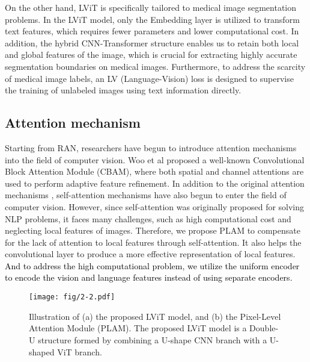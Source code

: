 \documentclass[lettersize,journal]{IEEEtran}
\begin{document}
{On the other hand, LViT is specifically tailored to medical image segmentation problems. In the LViT model, only the Embedding layer is utilized to transform text features, which requires fewer parameters and lower computational cost. 
In addition, the hybrid CNN-Transformer structure enables us to retain both local and global features of the image, which is crucial for extracting highly accurate segmentation boundaries on medical images. Furthermore, to address the scarcity of medical image labels, an LV (Language-Vision) loss is designed to supervise the training of unlabeled images using text information directly.
}
\subsection{Attention mechanism}
Starting from RAN\cite{34wang2017residual}, researchers have begun to introduce attention mechanisms into the field of computer vision. Woo et al \cite{36woo2018cbam} proposed a well-known Convolutional Block Attention Module (CBAM), where both spatial and channel attentions are used to perform adaptive feature refinement. 
In addition to the original attention mechanisms \cite{huang2020deep}, self-attention mechanisms \cite{30vaswani2017attention,42dosovitskiy2020image,li2021agmb,shan2023coarse} have also begun to enter the field of computer vision. However, since self-attention was originally proposed for solving NLP problems, it faces many challenges, such as high computational cost and neglecting local features of images. Therefore, we propose PLAM to compensate for the lack of attention to local features through self-attention. It also helps the convolutional layer to produce a more effective representation of local features. 
\textcolor{black}{And to address the high computational problem, we utilize the uniform encoder to encode the vision and language features instead of using separate encoders. }

\begin{figure*}[]\centering
  \texttt{[image: fig/2-2.pdf]}
  \caption{Illustration of (a) the proposed LViT model, and (b) the Pixel-Level Attention Module (PLAM). The proposed LViT model is a Double-U structure formed by combining a U-shape CNN branch with a U-shaped ViT branch.}
  \label{LViT}
  \vspace{-1mm}
\end{figure*}
\end{document}
